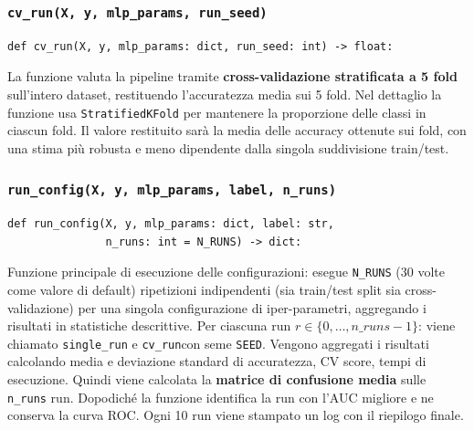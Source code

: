 \documentclass[11pt,a4paper]{article}
\begin{document}
\subsubsection{\texttt{cv\_run(X, y, mlp\_params, run\_seed)}}

\begin{lstlisting}
def cv_run(X, y, mlp_params: dict, run_seed: int) -> float:
\end{lstlisting}

La funzione valuta la pipeline tramite \textbf{cross-validazione stratificata
a 5 fold} sull'intero dataset, restituendo l'accuratezza media sui 5 fold.
Nel dettaglio la funzione usa \texttt{StratifiedKFold} per mantenere la proporzione delle classi
in ciascun fold. Il valore restituito sarà la media delle accuracy ottenute sui fold, con una stima più
robusta e meno dipendente dalla singola suddivisione train/test.


\subsubsection{\texttt{run\_config(X, y, mlp\_params, label, n\_runs)}}

\begin{lstlisting}
def run_config(X, y, mlp_params: dict, label: str,
               n_runs: int = N_RUNS) -> dict:
\end{lstlisting}
Funzione principale di esecuzione delle configurazioni: esegue \texttt{N\_RUNS} (30 volte come valore di default)
ripetizioni indipendenti (sia train/test split sia cross-validazione) per una
singola configurazione di iper-parametri, aggregando i risultati in statistiche
descrittive.
Per ciascuna run $r \in \{0, \ldots, n\_runs - 1\}$: viene chiamato \texttt{single\_run} e \texttt{cv\_run}con seme \texttt{SEED}.
Vengono aggregati i risultati calcolando media e deviazione standard di accuratezza, CV score, tempi di esecuzione.
Quindi viene calcolata la \textbf{matrice di confusione media} sulle \texttt{n\_runs} run.
Dopodiché la funzione identifica la run con l'AUC migliore e ne conserva la curva ROC.
Ogni 10 run viene stampato un log con il riepilogo finale.
\end{document}
